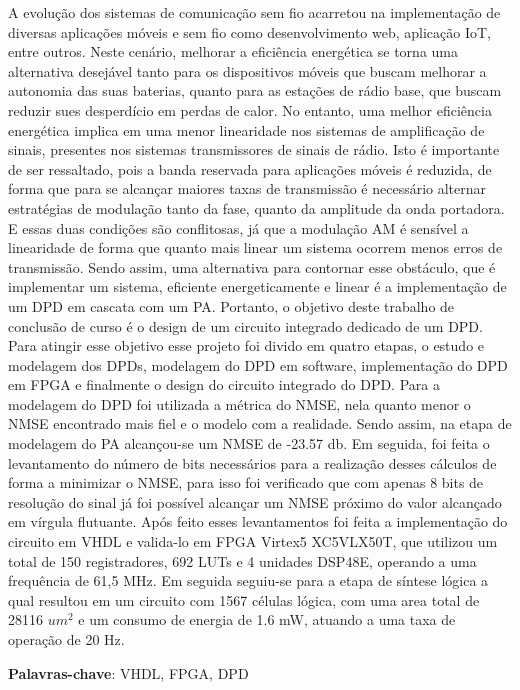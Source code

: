 A evolução dos sistemas de comunicação sem fio acarretou na implementação de diversas aplicações móveis e sem fio como desenvolvimento web, aplicação IoT, entre outros. Neste cenário, melhorar a eficiência energética se torna uma alternativa desejável tanto para os dispositivos móveis que buscam melhorar a autonomia das suas baterias, quanto para as estações de rádio base, que buscam reduzir sues desperdício em perdas de calor. No entanto, uma melhor eficiência energética implica em uma menor linearidade nos sistemas de amplificação de sinais, presentes nos sistemas transmissores de sinais de rádio. Isto é importante de ser ressaltado, pois a banda reservada para aplicações móveis é reduzida, de forma que para se alcançar maiores taxas de transmissão é necessário alternar estratégias de modulação tanto da fase, quanto da amplitude da onda portadora. E essas duas condições são conflitosas, já que a modulação AM é sensível a linearidade de forma que quanto mais linear um sistema ocorrem menos erros de transmissão. Sendo assim, uma alternativa para contornar esse obstáculo, que é implementar um sistema, eficiente energeticamente e linear é a implementação de um DPD em cascata com um PA. Portanto, o objetivo deste trabalho de conclusão de curso é o design de um circuito integrado dedicado de um DPD. Para atingir esse objetivo esse projeto foi divido em quatro etapas, o estudo e modelagem dos DPDs, modelagem do DPD em software, implementação do DPD em FPGA e finalmente o design do circuito integrado do DPD. Para a modelagem do DPD foi utilizada a métrica do NMSE, nela quanto menor o NMSE encontrado mais fiel e o modelo com a realidade. Sendo assim, na etapa de modelagem do PA alcançou-se um NMSE de -23.57 db. Em seguida, foi feita o levantamento do número de bits necessários para a realização desses cálculos de forma a minimizar o NMSE, para isso foi verificado que com apenas 8 bits de resolução do sinal já foi possível alcançar um NMSE próximo do valor alcançado em vírgula flutuante. Após feito esses levantamentos foi feita a implementação do circuito em VHDL e  valida-lo em FPGA Virtex5 XC5VLX50T, que utilizou um total de 150 registradores, 692 LUTs e 4 unidades DSP48E, operando a uma frequência de 61,5 MHz. Em seguida seguiu-se para a etapa de síntese lógica a qual resultou em um circuito com 1567 células lógica, com uma area total de 28116 $um^2$ e um consumo de energia de 1.6 mW, atuando a uma taxa de operação de 20 Hz.

\textbf{Palavras-chave}: VHDL, FPGA, DPD 
